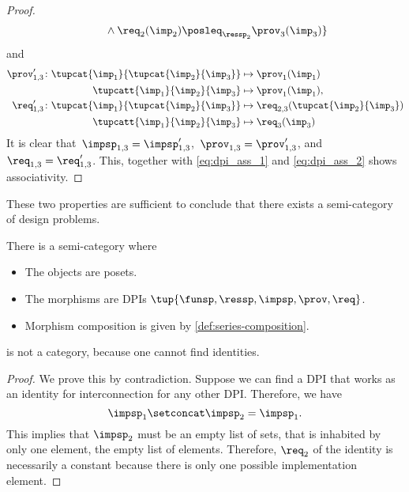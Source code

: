 \begin{proof}
\begin{equation}
\begin{aligned}
            &\qquad \wedge \req_2(\imp_2)\posleq_{\ressp_2}\prov_3(\imp_3)\}\\
        \end{aligned}
    \end{equation}
    and
    \begin{equation}
        \begin{aligned}
            \prov'_{1,3} \colon  \tupcat {\imp_{1}}{\tupcat {\imp_{2}} {\imp_{3}}}   &\mapsto\prov_{1}(\imp_{1})\\
            \tupcatt{\imp_{1}}{\imp_{2}}{\imp_{3}} &\mapsto\prov_{1}(\imp_{1}),\\
            \req'_{1,3} \colon  \tupcat {\imp_{1}}{\tupcat {\imp_{2}} {\imp_{3}}} &\mapsto\req_{2,3}(\tupcat {\imp_{2}} {\imp_{3}})\\
            \tupcatt{\imp_{1}}{\imp_{2}}{\imp_{3}}&\mapsto \req_{3}(\imp_{3})
        \end{aligned}
    \end{equation}
    It is clear that~$\impsp_{1,3}=\impsp'_{1,3}$,~$\prov_{1,3}=\prov'_{1,3}$, and~$\req_{1,3}=\req'_{1,3}$.
    This, together with \cref{eq:dpi_ass_1} and \cref{eq:dpi_ass_2} shows associativity.
\end{proof}

These two properties are sufficient to conclude that there exists a semi-category of design problems.



\begin{definition}
    \label{def:DPIcat}
    There is a semi-category \DPI where
    \begin{itemize}
        \item The objects are posets.
        \item The morphisms are DPIs $\tup{\funsp,\ressp,\impsp,\prov,\req}$.
        \item Morphism composition is given by \cref{def:series-composition}.
    \end{itemize}
\end{definition}

\begin{lemma}
    \DPI is not a category, because one cannot find identities.
\end{lemma}
\begin{proof}
    We prove this by contradiction. Suppose we can find a DPI that works as an identity for interconnection for any other DPI.
    Therefore, we have
    \begin{equation}
        \impsp_{1} \setconcat \impsp_{2} = \impsp_{1}.
    \end{equation}
    This implies that $\impsp_{2}$ must be an empty list of sets,  that is inhabited by only one element, the empty list of elements. Therefore, $\req_2$ of the identity is necessarily a constant because there is only one possible implementation element.  
\end{proof}

